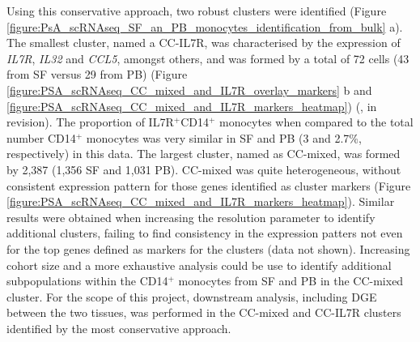 Using this conservative approach, two robust clusters were identified (Figure \ref{figure:PsA_scRNAseq_SF_an_PB_monocytes_identification_from_bulk} a). The smallest cluster, named a CC-IL7R, was characterised by the expression of \textit{IL7R}, \textit{IL32} and \textit{CCL5}, amongst others, and was formed by a total of 72 cells (43 from SF versus 29 from PB) (Figure \ref{figure:PSA_scRNAseq_CC_mixed_and_IL7R_overlay_markers} b and \ref{figure:PSA_scRNAseq_CC_mixed_and_IL7R_markers_heatmap}) (\parencite{Al-Mossawi2018}, in revision). The proportion of IL7R$^+$CD14$^+$ monocytes when compared to the total number CD14$^+$ monocytes was very similar in SF and PB (3 and 2.7\%, respectively) in this data. The largest cluster, named as CC-mixed, was formed by 2,387 (1,356 SF and 1,031 PB). CC-mixed was quite heterogeneous, without consistent expression pattern for those genes identified as cluster markers (Figure \ref{figure:PSA_scRNAseq_CC_mixed_and_IL7R_markers_heatmap}). Similar results were obtained when increasing the resolution parameter to identify additional clusters, failing to find consistency in the expression patters not even for the top genes defined as markers for the clusters (data not shown). Increasing cohort size and a more exhaustive analysis could be use to identify additional subpopulations within the CD14$^+$ monocytes from SF and PB in the CC-mixed cluster. For the scope of this project, downstream analysis, including DGE between the two tissues, was performed in the CC-mixed and CC-IL7R clusters identified by the most conservative approach.






